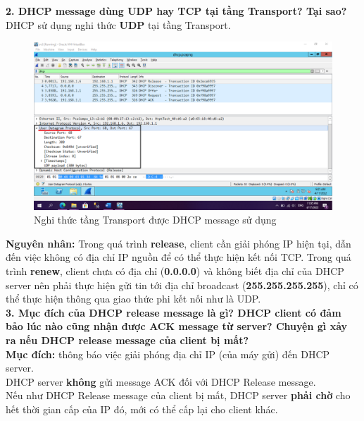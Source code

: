 \textbf{2.	DHCP message dùng UDP hay TCP tại tầng Transport? Tại sao?}\\
DHCP sử dụng nghi thức \textbf{UDP} tại tầng Transport.
\begin{figure}[H]
\begin{center}
\includegraphics[scale=.4]{../figures/p4/p4_2}
\end{center}
\caption{Nghi thức tầng Transport được DHCP message sử dụng}
\end{figure}
\textbf{Nguyên nhân:} Trong quá trình \textbf{release}, client cần giải phóng IP hiện tại, dẫn đến việc không có địa chỉ IP nguồn để có thể thực hiện kết nối TCP. Trong quá trình \textbf{renew}, client chưa có địa chỉ (\textbf{0.0.0.0}) và không biết địa chỉ của DHCP server nên phải thực hiện gửi tin tới địa chỉ broadcast (\textbf{255.255.255.255}), chỉ có thể thực hiện thông qua giao thức phi kết nối như là UDP.\\

\textbf{3.	Mục đích của DHCP release message là gì? DHCP client có đảm bảo lúc nào cũng nhận được ACK message từ server? Chuyện gì xảy ra nếu DHCP release message của client bị mất?}\\
\textbf{Mục đích:} thông báo việc giải phóng địa chỉ IP (của máy gửi) đến DHCP server.\\
DHCP server \textbf{không} gửi message ACK đối với DHCP Release message.\\
Nếu như DHCP Release message của client bị mất, DHCP server \textbf{phải chờ} cho hết thời gian cấp của IP đó, mới có thể cấp lại cho client khác.\\

